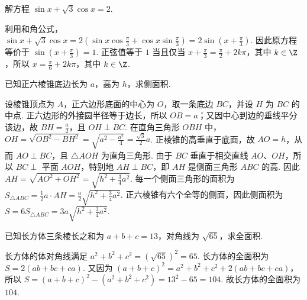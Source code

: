 \begin{problem}
解方程 \(\sin x+\sqrt{3}\cos x=2\).
\end{problem}

\begin{solution}
利用和角公式，\(\sin x+\sqrt{3}\cos x=2\left(\sin x\cos\frac{\pi}{3}+\cos x\sin\frac{\pi}{3}\right)=2\sin\left(x+\frac{\pi}{3}\right)\). 因此原方程等价于 \(\sin\left(x+\frac{\pi}{3}\right)=1\). 正弦值等于 \(1\) 当且仅当 \(x+\frac{\pi}{3}=\frac{\pi}{2}+2k\pi\)，其中 \(k\in\Z\)，所以 \(x=\frac{\pi}{6}+2k\pi\)，其中 \(k\in\Z\).

\end{solution}

\begin{problem}
已知正六棱锥底边长为 \(a\)，高为 \(h\)，求侧面积.
\end{problem}

\begin{solution}

设棱锥顶点为 \(A\)，正六边形底面的中心为 \(O\)，取一条底边 \(BC\)，并设 \(H\) 为 \(BC\) 的中点. 正六边形的外接圆半径等于边长，所以 \(OB=a\)；又因中心到边的垂线平分该边，故 \(BH=\frac{a}{2}\)，且 \(OH\perp BC\). 在直角三角形 \(OBH\) 中，\(OH=\sqrt{OB^{2}-BH^{2}}=\sqrt{a^{2}-\frac{a^{2}}{4}}=\frac{\sqrt{3}}{2}a\). 正棱锥的高垂直于底面，故 \(AO=h\)，从而 \(AO\perp BC\)，且 \(\triangle AOH\) 为直角三角形. 由于 \(BC\) 垂直于相交直线 \(AO\)、\(OH\)，所以 \(BC\perp\) 平面 \(AOH\)，特别地 \(AH\perp BC\)，即 \(AH\) 是侧面三角形 \(ABC\) 的高. 因此 \(AH=\sqrt{AO^{2}+OH^{2}}=\sqrt{h^{2}+\frac{3}{4}a^{2}}\). 每一个侧面三角形的面积为 \(S_{\triangle ABC}=\frac{1}{2}a\cdot AH=\frac{a}{2}\sqrt{h^{2}+\frac{3}{4}a^{2}}\). 正六棱锥有六个全等的侧面，因此侧面积为 \(S=6S_{\triangle ABC}=3a\sqrt{h^{2}+\frac{3}{4}a^{2}}\).

\end{solution}

\begin{problem}
已知长方体三条棱长之和为 \(a+b+c=13\)，对角线为 \(\sqrt{65}\)，求全面积.
\end{problem}

\begin{solution}
长方体的体对角线满足 \(a^{2}+b^{2}+c^{2}=\left(\sqrt{65}\right)^{2}=65\). 长方体的全面积为 \(S=2\left(ab+bc+ca\right)\). 又因为 \(\left(a+b+c\right)^{2}=a^{2}+b^{2}+c^{2}+2\left(ab+bc+ca\right)\)，所以 \(S=\left(a+b+c\right)^{2}-\left(a^{2}+b^{2}+c^{2}\right)=13^{2}-65=104\).
故长方体的全面积为 \(104\).

\end{solution}

